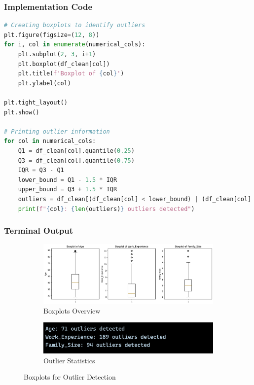 \documentclass[12pt,a4paper]{article}
\begin{document}
\subsubsection{Implementation Code}
\begin{lstlisting}[language=Python, caption=Identify Outliers Using Boxplots]
# Creating boxplots to identify outliers
plt.figure(figsize=(12, 8))
for i, col in enumerate(numerical_cols):
    plt.subplot(2, 3, i+1)
    plt.boxplot(df_clean[col])
    plt.title(f'Boxplot of {col}')
    plt.ylabel(col)

plt.tight_layout()
plt.show()

# Printing outlier information
for col in numerical_cols:
    Q1 = df_clean[col].quantile(0.25)
    Q3 = df_clean[col].quantile(0.75)
    IQR = Q3 - Q1
    lower_bound = Q1 - 1.5 * IQR
    upper_bound = Q3 + 1.5 * IQR
    outliers = df_clean[(df_clean[col] < lower_bound) | (df_clean[col] > upper_bound)]
    print(f"{col}: {len(outliers)} outliers detected")
\end{lstlisting}

\subsubsection{Terminal Output}

\begin{figure}[h!]
\centering
\begin{subfigure}[b]{0.8\textwidth}
    \centering
    \includegraphics[width=\textwidth]{Figures/boxplots_overview.png}
    \caption{Boxplots Overview}
    \label{fig:boxplots_overview}
\end{subfigure}
\hfill
\begin{subfigure}[b]{\textwidth}
    \centering
    \includegraphics[width=\textwidth]{Figures/outlier_statistics.png}
    \caption{Outlier Statistics}
    \label{fig:outlier_stats}
\end{subfigure}
\caption{Boxplots for Outlier Detection}
\label{fig:outlier_analysis}
\end{figure}
\end{document}
